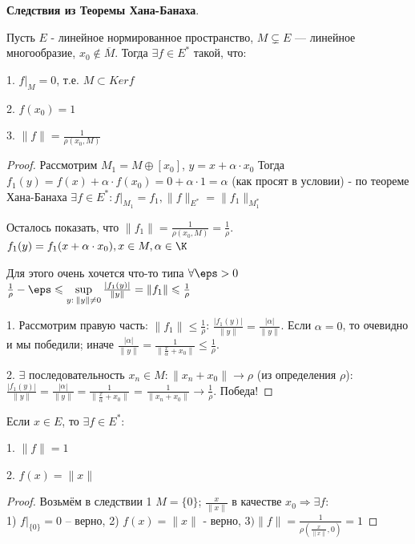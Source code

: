 \noindent\textbf{Следствия из Теоремы Хана-Банаха}.

\begin{corollary} Пусть $E$ - линейное нормированное пространство, $M \subsetneq E$ --- линейное многообразие, $x_0 \notin \overline{M} $. Тогда $\exists f \in E^*$ такой, что:

1. $f |_M = 0$, т.е. $M \subset Ker f$

2. $f(x_0) = 1$

3. $\|f\| = \frac{1}{\rho(x_0, M)}$
\end{corollary}

\begin{proof} Рассмотрим $M_1 = M \oplus [x_0]$, $y = x + \alpha \cdot x_0$
Тогда $f_1(y) = f(x) + \alpha \cdot f(x_0) = 0 + \alpha \cdot 1 = \alpha$ (как просят в условии) - по теореме Хана-Банаха $\exists f \in E^*: f|_{M_1} = f_1, \|f\|_{E^*} = \|f_1\|_{M_1^*}$

Осталось показать, что $\|f_1\| = \frac{1}{\rho(x_0, M)} = \frac 1 \rho$. $f_1(y) = f_1(x + \alpha \cdot x_0), x \in M, \alpha \in \K$

Для этого очень хочется что-то типа $\forall \eps > 0$ $\frac{1}{\rho} - \eps \leqslant \sup\limits_{y:\:\|y\| \neq 0} \frac{|f_1(y)|}{\|y\|} = \|f_1\| \leqslant \frac{1}{\rho}$

1. Рассмотрим правую часть: $\|f_1\| \leqslant \frac{1}{\rho}$: $\frac{|f_1(y)|}{\|y\|} = \frac{|\alpha|}{\|y\|}$. Если $\alpha = 0$, то очевидно и мы победили; иначе $\frac{|\alpha|}{\|y\|} = \frac{1}{\|\frac{x}{\alpha} + x_0\|} \leqslant \frac{1}{\rho}$. 

2. $\exists$ последовательность $x_n \in M: \|x_n + x_0 \| \to \rho$ (из определения $\rho$): $\frac{|f_1(y)|}{\|y\|} = \frac{|\alpha|}{\|y\|}  = \frac{1}{\|\frac{x}{\alpha} + x_0\|}$ = $\frac{1}{\|x_n + x_0\|} \to \frac{1}{\rho}$. Победа!


\end{proof}

\begin{corollary} Если $x \in E$, то $\exists f \in E^*$:

1. $\|f\| = 1$

2. $f(x) = \|x\|$
\end{corollary}
\begin{proof}
Возьмём в следствии 1 $M = \{0\}$; $\frac{x}{\|x\|}$ в качестве $x_0 \Rightarrow \exists f:$ \\ 1) $ f|_{\{0\}} = 0$ -- верно, 2) $ f(x) = \|x\|$ - верно, $3) \|f\| = \frac{1}{\rho \left(\frac{x}{\|x\|}, 0 \right)} = 1$
\end{proof}


